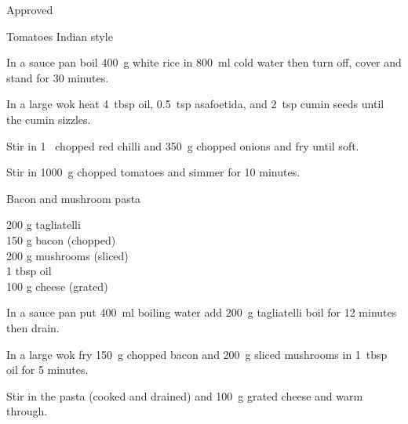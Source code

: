 \begin{menu}{Approved}
\begin{recipe}{2}{Tomatoes Indian style}
\begin{ingredients}
		\end{ingredients}
	
	
    \begin{instructions}
    \item 
      In a
      sauce pan
      boil
      400~g  white rice
      in
      800~ml  cold water
      then turn off, cover and stand for 30 minutes.
    \item 
        In a large wok heat
        4~tbsp  oil,
        0.5~tsp  asafoetida,
        and
        2~tsp  cumin seeds
        until
        the cumin sizzles.
      \item 
        Stir in
        1~ chopped red chilli
        and
        350~g chopped onions
        and
        fry until soft.
      \item 
        Stir in
        1000~g chopped tomatoes
        and
        simmer for 10 minutes.
      
    \end{instructions}
    \end{recipe}%
  
    \begin{recipe}{1}{Bacon and mushroom pasta}%
    
		\begin{ingredients}
		200 g tagliatelli  \\
	150 g bacon (chopped) \\
	200 g mushrooms (sliced) \\
	1 tbsp oil  \\
	100 g cheese (grated) \\
	
		\end{ingredients}
	
    \begin{instructions}
    \item 
      In a
      sauce pan
      put
      400~ml  boiling water
      add
      200~g  tagliatelli
      boil for 12 minutes then drain.
    \item 
        In a large wok fry 150~g chopped bacon
        and
        200~g sliced mushrooms
        in
        1~tbsp  oil for 5 minutes.
      \item 
        Stir in the pasta (cooked and drained)
        and 100~g grated cheese
        and warm through.
      
    \end{instructions}
    \end{recipe}%
  
    \clearpage
    \end{menu}
	
	
